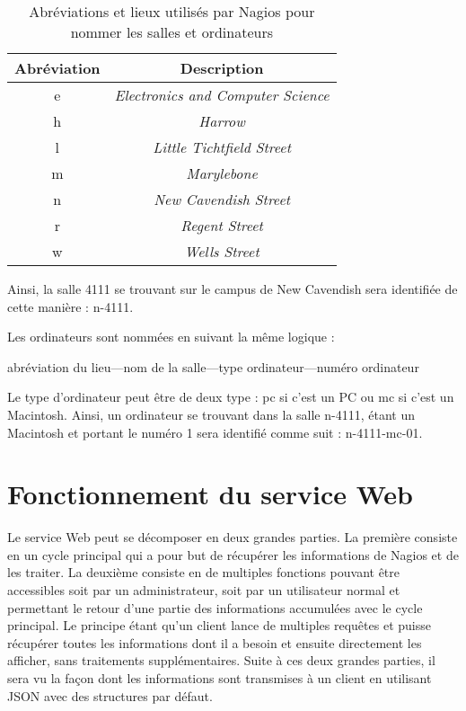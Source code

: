 \begin{table}[!ht]
	\centering
	\begin{tabular}{|c|c|}
		\hline
		\rowcolor{grisclair} \textbf{Abr\'eviation} & \textbf{Description}\\
		\hline
		e & \textit{Electronics and Computer Science}\\
		\hline
		h & \textit{Harrow}\\
		\hline
		l & \textit{Little Tichtfield Street}\\
		\hline
		m & \textit{Marylebone}\\
		\hline
		n & \textit{New Cavendish Street}\\
		\hline
		r & \textit{Regent Street}\\
		\hline
		w & \textit{Wells Street}\\
		\hline
	
	\end{tabular}
	
	\caption{Abr\'eviations et lieux utilis\'es par Nagios pour nommer les salles et ordinateurs}
	\label{table:abreviation}

\end{table}

Ainsi, la salle \textsf{4111} se trouvant sur le campus de New Cavendish sera identifi\'ee de cette mani\`ere : \textsf{n-4111}.

\noindent Les ordinateurs sont nomm\'ees en suivant la m\^eme logique :

\begin{center}
	\textsf{abr\'eviation du lieu---nom de la salle---type ordinateur---num\'ero ordinateur}
	
\end{center}

Le type d'ordinateur peut \^etre de deux type : \textsf{pc} si c'est un PC ou \textsf{mc} si c'est un Macintosh.
Ainsi, un ordinateur se trouvant dans la salle \textsf{n-4111}, \'etant un Macintosh et portant le num\'ero 1 sera identifi\'e comme suit : \textsf{n-4111-mc-01}.

\section{Fonctionnement du service Web}

Le service Web peut se d\'ecomposer en deux grandes parties.
La premi\`ere consiste en un cycle principal qui a pour but de r\'ecup\'erer les informations de Nagios et de les traiter.
La deuxi\`eme consiste en de multiples fonctions pouvant \^etre accessibles soit par un administrateur, soit par un utilisateur normal et permettant le retour d'une partie des informations accumul\'ees avec le cycle principal.
Le principe \'etant qu'un client lance de multiples requ\^etes et puisse r\'ecup\'erer toutes les informations dont il a besoin et ensuite directement les afficher, sans traitements suppl\'ementaires.
Suite \`a ces deux grandes parties, il sera vu la fa\c{c}on dont les informations sont transmises \`a un client en utilisant JSON avec des structures par d\'efaut.

